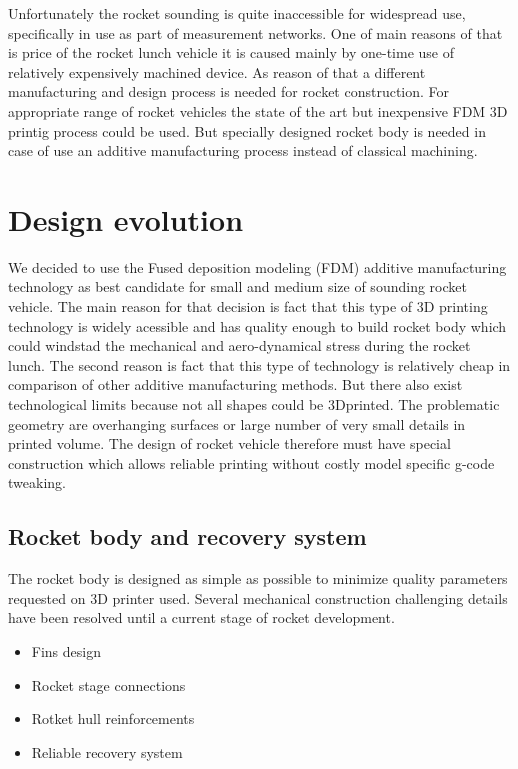 \documentclass{poster16}
\begin{document}
Unfortunately the rocket sounding is quite inaccessible for widespread use, specifically in use as part of measurement networks. One of main reasons of that is price of the rocket lunch vehicle it is caused mainly by one-time use of relatively expensively machined device. 
As reason of that a different manufacturing and design process is needed for rocket construction. 
For appropriate range of rocket vehicles the state of the art but inexpensive FDM 3D printig process could be used. But specially designed rocket body is needed in case of use an additive manufacturing process instead of classical machining. 

\section{Design evolution}

We decided to use the Fused deposition modeling (FDM) additive manufacturing technology as best candidate for small and medium size of sounding rocket vehicle. The main reason for that decision is fact that this type of 3D printing technology is widely acessible and has quality enough to build rocket body which could windstad the mechanical and aero-dynamical stress during the rocket lunch. The second reason is fact that this type of technology is relatively  cheap in comparison of other additive manufacturing methods. 
But there also exist technological limits because not all shapes could be 3Dprinted. The problematic geometry are overhanging surfaces or large number of very small details in printed volume. 
The design of rocket vehicle therefore must have special construction which allows reliable printing without costly model specific g-code tweaking. 

\subsection{Rocket body and recovery system}

The rocket body is designed as simple as possible to minimize quality parameters requested on 3D printer used. Several mechanical construction challenging details have been resolved until a current stage of rocket development. 

\begin{itemize}
\item Fins design
\item Rocket stage connections
\item Rotket hull reinforcements
\item Reliable recovery system
\end{itemize}
\end{document}
